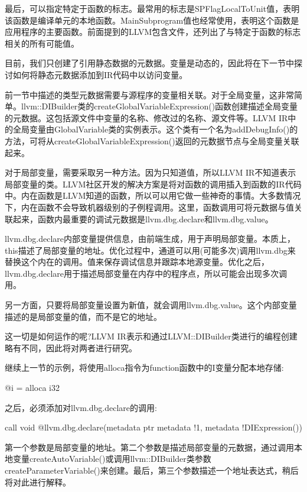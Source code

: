 最后，可以指定特定于函数的标志。最常用的标志是SPFlagLocalToUnit值，表明该函数是编译单元的本地函数。MainSubprogram值也经常使用，表明这个函数是应用程序的主要函数。前面提到的LLVM包含文件，还列出了与特定于函数的标志相关的所有可能值。

目前，我们只创建了引用静态数据的元数据。变量是动态的，因此将在下一节中探讨如何将静态元数据添加到IR代码中以访问变量。


前一节中描述的类型元数据需要与源程序的变量相关联。对于全局变量，这非常简单。llvm::DIBuilder类的createGlobalVariableExpression()函数创建描述全局变量的元数据。这包括源文件中变量的名称、修改过的名称、源文件等。LLVM IR中的全局变量由GlobalVariable类的实例表示。这个类有一个名为addDebugInfo()的方法，可将从createGlobalVariableExpression()返回的元数据节点与全局变量关联起来。

对于局部变量，需要采取另一种方法。因为只知道值，所以LLVM IR不知道表示局部变量的类。LLVM社区开发的解决方案是将对函数的调用插入到函数的IR代码中。内在函数是LLVM知道的函数，所以可以用它做一些神奇的事情。大多数情况下，内在函数不会导致机器级别的子例程调用。这里，函数调用可将元数据与值关联起来，函数内最重要的调试元数据是llvm.dbg.declare和llvm.dbg.value。

llvm.dbg.declare内部变量提供信息，由前端生成，用于声明局部变量。本质上，this描述了局部变量的地址。优化过程中，通道可以用(可能多次)调用llvm.dbg来替换这个内在的调用。值来保存调试信息并跟踪本地源变量。优化之后，llvm.dbg.declare用于描述局部变量在内存中的程序点，所以可能会出现多次调用。

另一方面，只要将局部变量设置为新值，就会调用llvm.dbg.value。这个内部变量描述的是局部变量的值，而不是它的地址。

这一切是如何运作的呢?LLVM IR表示和通过LLVM::DIBuilder类进行的编程创建略有不同，因此将对两者进行研究。

继续上一节的示例，将使用alloca指令为function函数中的I变量分配本地存储:

\begin{shell}
@i = alloca i32
\end{shell}

之后，必须添加对llvm.dbg.declare的调用:

\begin{shell}
call void @llvm.dbg.declare(metadata ptr %
                metadata !1, metadata !DIExpression())
\end{shell}

第一个参数是局部变量的地址。第二个参数是描述局部变量的元数据，通过调用本地变量createAutoVariable()或调用llvm::DIBuilder类参数createParameterVariable()来创建。最后，第三个参数描述一个地址表达式，稍后将对此进行解释。

